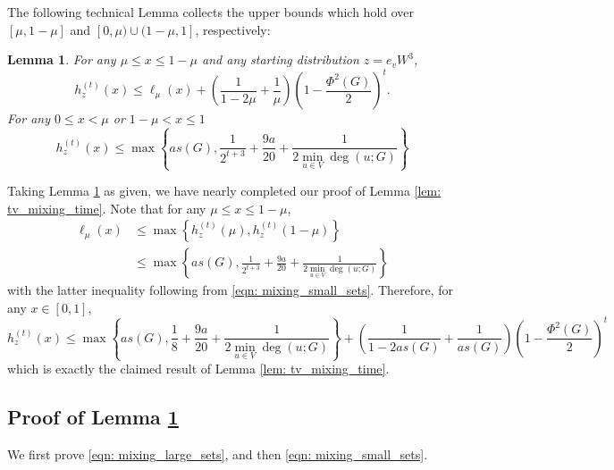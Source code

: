 \documentclass[11pt,twoside]{article}
\newtheorem{lemma}{Lemma}
\newcommand{\set}[1]{\left\{#1\right\}}
\newcommand{\1}{\mathbf{1}}
\begin{document}
The following technical Lemma collects the upper bounds which hold over $[\mu, 1 - \mu]$ and $[0,\mu) \cup (1 - \mu, 1]$, respectively:
\begin{lemma}
	\label{lem: mixing_all_sets}
	For any $\mu \leq x \leq 1 - \mu$ and any starting distribution $z = e_vW^3$,
	\begin{equation}
	\label{eqn: mixing_large_sets}
	h_z^{(t)}(x) \leq \ell_{\mu}(x) + \left(\frac{1}{1 - 2\mu} + \frac{1}{\mu}\right)\left(1 - \frac{\Phi^2(G)}{2}\right)^t.
	\end{equation}
	For any $0 \leq x < \mu$ or $1 - \mu < x \leq 1$
	\begin{equation}
	\label{eqn: mixing_small_sets}
	h_z^{(t)}(x) \leq \max\set{as(G), \frac{1}{2^{t+3}} + \frac{9a}{20} + \frac{1}{2 \min_{u \in V}\deg(u;G)} }
	\end{equation}
\end{lemma}
\noindent Taking Lemma \ref{lem: mixing_all_sets} as given, we have nearly completed our proof of Lemma \ref{lem: tv_mixing_time}. Note that for any $\mu \leq x \leq 1 - \mu$,
\begin{align*}
\ell_{\mu}(x) & \leq \max\set{h_z^{(t)}(\mu),h_z^{(t)}(1 - \mu)} \\
& \leq \max\set{as(G), \frac{1}{2^{t + 3}} + \frac{9a}{20} + \frac{1}{2 \min_{u \in V}\deg(u;G)} }
\end{align*}
with the latter inequality following from \eqref{eqn: mixing_small_sets}. Therefore, for any $x \in [0,1]$,
\begin{equation*}
h_z^{(t)}(x) \leq \max\set{as(G), \frac{1}{8} + \frac{9a}{20} + \frac{1}{2 \min_{u \in V}\deg(u;G)} } + \left(\frac{1}{1 - 2as(G)} + \frac{1}{as(G)}\right)\left(1 - \frac{\Phi^2(G)}{2}\right)^t
\end{equation*}
which is exactly the claimed result of Lemma \ref{lem: tv_mixing_time}.

\subsection{Proof of Lemma \ref{lem: mixing_all_sets}}

We first prove \eqref{eqn: mixing_large_sets}, and then \eqref{eqn: mixing_small_sets}.
\end{document}
